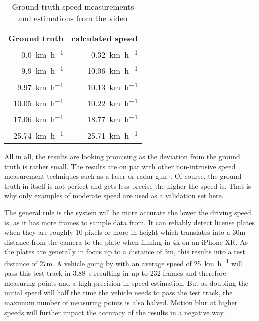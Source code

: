 \begin{table}[]
    \centering
    \begin{tabular}{|r|r|}
        \hline
        \multicolumn{1}{|l|}{Ground truth} & \multicolumn{1}{l|}{calculated speed} \\ \hline
        \SI{0.0}{\kilo\metre\per\hour}     & \SI{0.32}{\kilo\metre\per\hour}      \\
        \SI{9.9}{\kilo\metre\per\hour}     & \SI{10.06}{\kilo\metre\per\hour}      \\
        \SI{9.97}{\kilo\metre\per\hour}    & \SI{10.13}{\kilo\metre\per\hour}      \\
        \SI{10.05}{\kilo\metre\per\hour}   & \SI{10.22}{\kilo\metre\per\hour}      \\
        \SI{17.06}{\kilo\metre\per\hour}   & \SI{18.77}{\kilo\metre\per\hour}      \\
        \SI{25.74}{\kilo\metre\per\hour}   & \SI{25.71}{\kilo\metre\per\hour}      \\ \hline
    \end{tabular}
    \caption{Ground truth speed measurements \\and estimations from the video}
    \label{tab:speedEstimation}
\end{table}

All in all, the results are looking promising as the deviation from the ground truth is rather small.
The results are on par with other non-intrusive speed measurement techniques such as a laser or radar gun~\cite{Adnan2013}.
Of course, the ground truth in itself is not perfect and gets less precise the higher the speed is.
That is why only examples of moderate speed are used as a validation set here.

The general rule is the system will be more accurate the lower the driving speed is, as it has more frames to sample data from.
It can reliably detect license plates when they are roughly 10 pixels or more in height which translates into a 30m distance from the camera to the plate when filming in 4k on an iPhone XR.
As the plates are generally in focus up to a distance of 3m, this results into a test distance of 27m.
A vehicle going by with an average speed of \SI{25}{\kilo\metre\per\hour} will pass this test track in \SI{3.88}{\second} resulting in up to 232 frames and therefore measuring points and a high precision in speed estimation.
But as doubling the initial speed will half the time the vehicle needs to pass the test track, the maximum number of measuring points is also halved.
Motion blur at higher speeds will further impact the accuracy of the results in a negative way.



